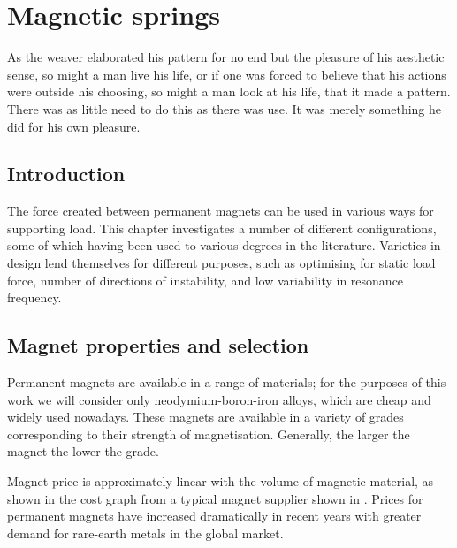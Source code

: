 \documentclass[11pt,a4paper]{memoir}
\begin{document}
\chapter{Magnetic springs}

\epigraph {
  As the weaver elaborated his pattern for no end but the pleasure of his aesthetic sense, so might a man live his life, or if one was forced to believe that his actions were outside his choosing, so might a man look at his life, that it made a pattern.
  There was as little need to do this as there was use.
  It was merely something he did for his own pleasure.
}
{\textcite{maugham1915}}

\section{Introduction}

The force created between permanent magnets can be used in various ways for supporting load.
This chapter investigates a number of different configurations, some of which having been used to various degrees in the literature.
Varieties in design lend themselves for different purposes, such as optimising for static load force, number of directions of instability, and low variability in resonance frequency.


\section{Magnet properties and selection}

Permanent magnets are available in a range of materials; for the purposes of this work we will consider only neodymium-boron-iron alloys, which are cheap and widely used nowadays.
These magnets are available in a variety of grades corresponding to their strength of magnetisation.
Generally, the larger the magnet the lower the grade.

Magnet price is approximately linear with the volume of magnetic material, as shown in the cost graph from a typical magnet supplier shown in .
Prices for permanent magnets have increased dramatically in recent years with greater demand for rare-earth metals in the global market.

\begin{figure}
\end{figure}
\end{document}
